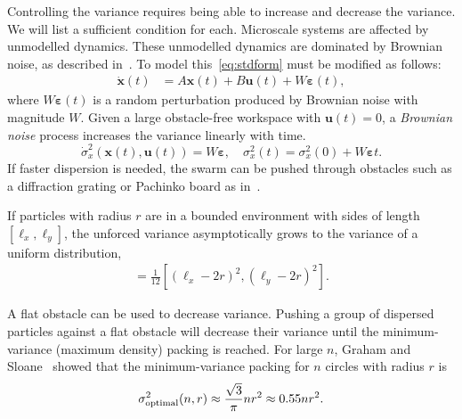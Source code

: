 Controlling the variance requires being able to increase and decrease the variance.  We will list a sufficient condition for each. 
Microscale systems are affected by unmodelled dynamics. 
These unmodelled dynamics are dominated by Brownian noise, as described in~\cite{einstein1956investigations}. 
To model this~\eqref{eq:stdform} must be modified as follows:
\begin{align}
\dot{\mathbf{x}}(t)  &=  A \mathbf{x}(t) + B \mathbf{u}(t) + W \bm{\varepsilon}(t),
\end{align}
where $W\bm{\varepsilon}(t)$ is a random perturbation produced by Brownian noise with magnitude $W$. Given a large obstacle-free workspace with $\mathbf{u}(t)= 0$, a \emph{Brownian noise} process increases the variance linearly with time.
\begin{equation}
\dot{\sigma}_x^2(\mathbf{x}(t), \mathbf{u}(t))  = W \bm{\varepsilon},
\quad \sigma_x^2(t)  = \sigma_x^2(0) + W \bm{\varepsilon} t.
\end{equation}
 If faster dispersion is needed, the swarm can be pushed through obstacles such as a diffraction grating or Pachinko board as in~\cite{Becker2013b}. 

If particles with radius $r$ are in a bounded environment with sides of length $[\ell_x, \ell_y]$, the unforced variance asymptotically grows to the variance of a uniform distribution,
\begin{align}
[\sigma_x^2,\sigma_y^2] = \frac{1}{12}[ (\ell_x - 2 r)^2,(\ell_y - 2 r)^2].\label{eq:VarianceUniformDistribution}
\end{align}

 A flat obstacle can be used to decrease variance. Pushing a group of dispersed particles against a flat obstacle will decrease their variance until the minimum-variance (maximum density) packing  is reached. For large $n$, Graham and Sloane~\cite{graham1990penny} showed that the minimum-variance packing  for $n$ circles with radius $r$ is 
 \begin{align} \label{eq:optimalvar}
 \sigma^2_{\rm{optimal}}(n,r) \approx   \frac{\sqrt{3}}{\pi} n r^2\approx 0.55 n r^2.
 \end{align} 

